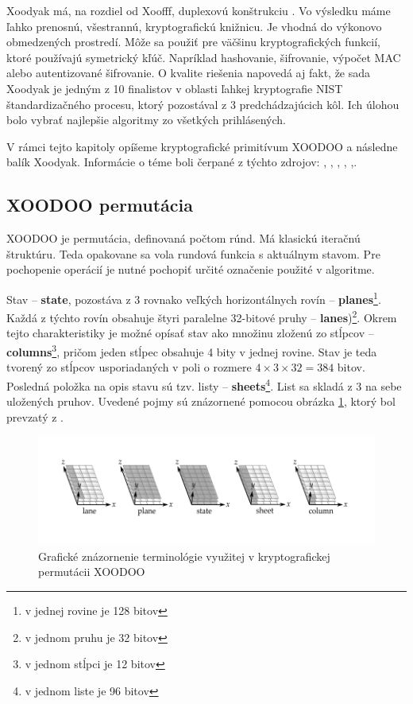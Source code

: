 Xoodyak má, na rozdiel od Xoofff, duplexovú konštrukciu \cite{duplex}. Vo výsledku máme ľahko prenosnú, všestrannú, kryptografickú knižnicu. Je vhodná do výkonovo obmedzených prostredí. Môže sa použiť pre väčšinu kryptografických funkcií, ktoré používajú symetrický kľúč. Napríklad hashovanie, šifrovanie, výpočet MAC alebo autentizované šifrovanie. O kvalite riešenia napovedá aj fakt, že sada Xoodyak je jedným z 10 finalistov v oblasti ľahkej kryptografie NIST štandardizačného procesu, ktorý pozostával z 3 predchádzajúcich kôl. Ich úlohou bolo vybrať najlepšie algoritmy zo všetkých prihlásených.

V rámci tejto kapitoly opíšeme kryptografické primitívum XOODOO a následne balík Xoodyak. Informácie o téme boli čerpané z týchto zdrojov: \cite{tkecak}, \cite{xd}, \cite{xcb}, \cite{xoodoocb}, \cite{xdupdate},\cite{xdr1}.
\subsection{XOODOO permutácia}
XOODOO je permutácia, definovaná počtom rúnd. Má klasickú iteračnú štruktúru. Teda opakovane sa vola rundová funkcia s aktuálnym stavom. Pre pochopenie operácií je nutné pochopiť určité označenie použité v algoritme.

Stav -- \textbf{state}, pozostáva z 3 rovnako veľkých horizontálnych rovín -- \textbf{planes}\footnote{v jednej rovine je 128 bitov}. Každá z týchto rovín obsahuje štyri paralelne 32-bitové pruhy -- \textbf{lanes})\footnote{v jednom pruhu je 32 bitov}. Okrem tejto charakteristiky je možné opísať stav ako množinu zloženú zo stĺpcov -- \textbf{columns}\footnote{v jednom stĺpci je 12 bitov}, pričom jeden stĺpec obsahuje 4 bity v jednej rovine. Stav je teda tvorený zo stĺpcov usporiadaných v poli o rozmere $4\times3\times32 = 384$ bitov. Posledná položka na opis stavu sú tzv. listy -- \textbf{sheets}\footnote{v jednom liste je 96 bitov}. List sa skladá z 3 na sebe uložených pruhov. Uvedené pojmy sú znázornené pomocou obrázka \ref{xoodooterm}, ktorý bol prevzatý z \cite{xcb}.

\begin{figure}[!h]
	\centering
	\includegraphics[width=1\textwidth]{figures/xoodooTerminology}
	\caption{Grafické znázornenie terminológie využitej v kryptografickej permutácii XOODOO \cite{xcb}}
	\label{xoodooterm}
\end{figure}

